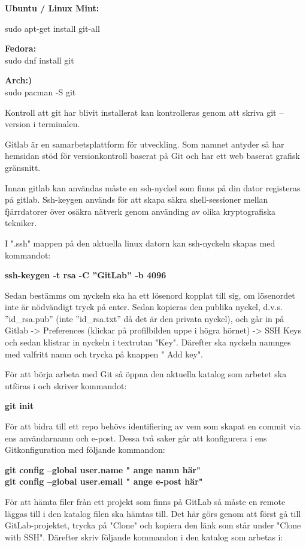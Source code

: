 \documentclass{TDP003mall}
\begin{document}
\textbf{Ubuntu / Linux Mint:}\\
{sudo apt-get install git-all

\textbf{Fedora:}\\
sudo dnf install git

\textbf{Arch:)}\\
sudo pacman -S git

Kontroll att git har blivit installerat kan kontrolleras genom att skriva git --version i terminalen.

Gitlab är en samarbetsplattform för utveckling. Som namnet antyder så har hemsidan stöd för versionkontroll baserat på Git och har ett web baserat grafisk gränsnitt.  

Innan gitlab kan användas måste en ssh-nyckel som finns på din dator registeras på gitlab. Ssh-keygen används för att skapa säkra shell-sessioner mellan fjärrdatorer över osäkra nätverk genom använding av olika kryptografiska tekniker.

I ".ssh" mappen på den aktuella linux datorn kan ssh-nyckeln skapas med kommandot:

\textbf{ssh-keygen -t rsa -C ''GitLab'' -b 4096}

Sedan bestämms om nyckeln ska ha ett lösenord kopplat till sig, om lösenordet inte är nödvändigt tryck på enter. Sedan kopieras den publika nyckel, d.v.s. ''id\_rsa.pub'' (inte ''id\_rsa.txt'' då det är den privata nyckel), och går in på Gitlab -> Preferences (klickar på profilbilden uppe i högra hörnet) -> SSH Keys och sedan klistrar in nyckeln i textrutan "Key". Därefter ska nyckeln namnges med valfritt namn och trycka på knappen " Add key".

För att börja arbeta med Git så öppna den aktuella katalog som arbetet ska utföras i och skriver kommandot:

\textbf{git init}

För att bidra till ett repo behövs identifiering av vem som skapat en commit via ens användarnamn och e-post. Dessa två saker går att konfigurera i ens Gitkonfiguration med följande kommandon:

\textbf{git config --global user.name " ange namn här"}
\\
\textbf{git config --global user.email " ange e-post här"}

För att hämta filer från ett projekt som finns på GitLab så måste en remote läggas till i den katalog filen ska hämtas till. Det här görs genom att först gå till GitLab-projektet, trycka på "Clone" och kopiera den länk som står under "Clone with SSH". Därefter skriv följande kommandon i den katalog som arbetas i:

}
\end{document}
